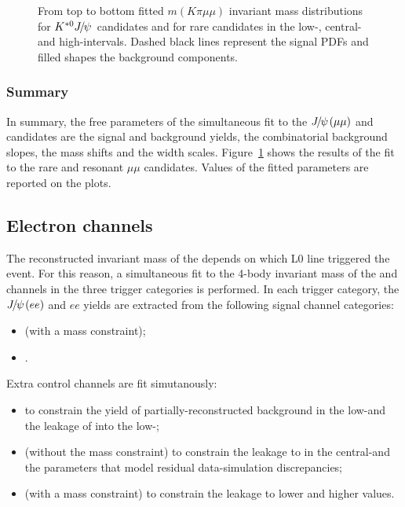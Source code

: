 \begin{figure}[h!]
\caption{From top to bottom fitted $m(K\pi \mu\mu)$ invariant mass distributions
 for $\Kstarz\jpsi$ candidates and for rare candidates in the low-, central- and high-\qsq intervals.
Dashed black lines represent the signal PDFs and filled shapes the background components. }
\label{fig:mumu_data_fits}
\end{figure}
\clearpage

\subsubsection{Summary}

In summary, the free parameters of the simultaneous fit to the $\jpsi(\mu\mu)$ and \mm candidates are the signal and background yields, the combinatorial background slopes, the mass shifts and the width scales.
Figure~\ref{fig:mumu_data_fits} shows the results of the fit to the rare and resonant
$\mu\mu$ candidates. Values of the fitted parameters are reported on the plots.


\subsection{Electron channels}
\label{sec:RKst_fit_ee}

The reconstructed invariant mass of the \Bz depends on which L0 line triggered the event.
For this reason, a simultaneous fit to the 4-body invariant mass of the \BdToKstJPsee and \BdToKstee 
channels in the three trigger categories is performed.
%
In each trigger category, the $\jpsi(ee)$ and $ee$ yields are extracted from the following signal channel categories:
%
\begin{itemize}
\item \BdToKstJPsee (with a \jpsi mass constraint);
\item \BdToKstee.
\end{itemize}

Extra control channels are fit simutanously:
%
\begin{itemize}
\item \BdToKstGee to constrain the yield of partially-reconstructed background 
in the low-\qsq and the leakage of \BdToKstG into the low-\qsq;
\item \BdToKstJPsee (without the \jpsi mass constraint) to constrain the leakage to \BdToKstee in the central-\qsq and the 
parameters that model residual data-simulation discrepancies;
\item \BdToKstPsiee (with a \psitwos mass constraint) to constrain the leakage to lower and higher \qsq values.
\end{itemize}

